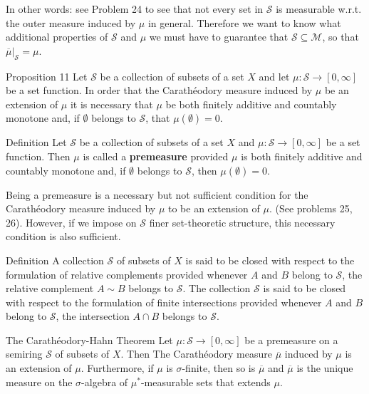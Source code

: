 In other words: see Problem 24 to see that not every set in $\mathcal{S}$ is measurable w.r.t. the outer measure induced by $\mu$ in general.
Therefore we want to know what additional properties of $\mathcal{S}$ and $\mu$ we must have to guarantee that $\mathcal{S}\subseteq\mathcal{M}$, so that $\overline{\mu}|_\mathcal{S}=\mu$. 
\begin{namedthm*}{Proposition 11}
	Let $\mathcal{S}$ be a collection of subsets of a set $X$ and let $\mu:\mathcal{S}\to[0,\infty]$ be a set function.
	In order that the Carath\'eodory measure induced by $\mu$ be an extension of $\mu$ it is necessary that $\mu$ be both finitely additive and countably monotone and, if $\emptyset$ belongs to $\mathcal{S}$, that $\mu(\emptyset)=0$.
\end{namedthm*}
\begin{namedthm*}{Definition}
	Let $\mathcal{S}$ be a collection of subsets of a set $X$ and $\mu:\mathcal{S}\to[0,\infty]$ be a set function.
	Then $\mu$ is called a \textbf{premeasure} provided $\mu$ is both finitely additive and countably monotone and, if $\emptyset$ belongs to $\mathcal{S}$, then $\mu(\emptyset)=0$.
\end{namedthm*}
Being a premeasure is a necessary but not sufficient condition for the Carath\'eodory measure induced by $\mu$ to be an extension of $\mu$. 
(See problems 25, 26).
However,  if we impose on $\mathcal{S}$ finer set-theoretic structure, this necessary condition is also sufficient.
\begin{namedthm*}{Definition}
	A collection $\mathcal{S}$ of subsets of $X$ is said to be closed with respect to the formulation of relative complements provided whenever $A$ and $B$ belong to $\mathcal{S}$, the relative complement $A\sim B$ belongs to $\mathcal{S}$.
	The collection $\mathcal{S}$ is said to be closed with respect to the formulation of finite intersections provided whenever $A$ and $B$ belong to $\mathcal{S}$, the intersection $A\cap B$ belongs to $\mathcal{S}$.
\end{namedthm*}

\begin{namedthm*}{The Carath\'eodory-Hahn Theorem}
	Let $\mu:\mathcal{S}\to[0,\infty]$ be a premeasure on a semiring $\mathcal{S}$ of subsets of $X$.
	Then The Carath\'eodory measure $\overline\mu$ induced by $\mu$ is an extension of $\mu$.
	Furthermore, if $\mu$ is $\sigma$-finite, then so is $\overline\mu$ and $\overline\mu$ is the unique measure on the $\sigma$-algebra of $\mu^*$-measurable sets that extends $\mu$. 
\end{namedthm*}


